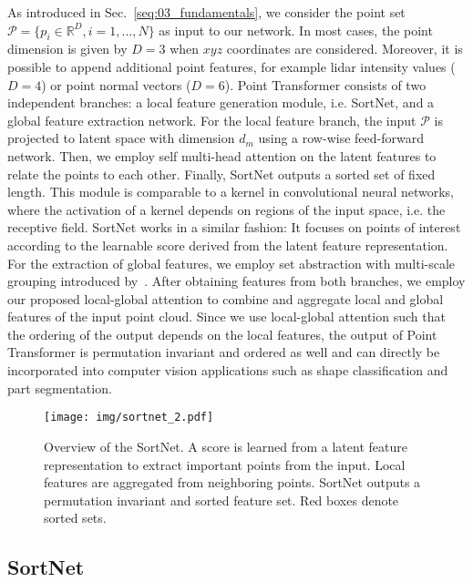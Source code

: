 \documentclass{ieeeaccess}
\begin{document}
As introduced in Sec.~\ref{seq:03_fundamentals}, we consider the point set \mbox{$\mathcal{P} = \{p_i \in \mathbb{R}^D, i = 1, \dots, N\}$} as input to our network. In most cases, the point dimension is given by $D=3$ when $xyz$ coordinates are considered. Moreover, it is possible to append additional point features, for example lidar intensity values ($D=4$) or point normal vectors ($D=6$). Point Transformer consists of two independent branches: a local feature generation module, i.e. SortNet, and a global feature extraction network. For the local feature branch, the input $\mathcal{P}$ is projected to latent space with dimension $d_m$ using a row-wise feed-forward network. Then, we employ self multi-head attention on the latent features to relate the points to each other. Finally, SortNet outputs a sorted set of fixed length. This module is comparable to a kernel in convolutional neural networks, where the activation of a kernel depends on regions of the input space, i.e. the receptive field. SortNet works in a similar fashion: It focuses on points of interest according to the learnable score derived from the latent feature representation. For the extraction of global features, we employ set abstraction with multi-scale grouping introduced by~\cite{qi2017pointnet++}.
After obtaining features from both branches, we employ our proposed local-global attention to combine and aggregate local and global features of the input point cloud.
Since we use local-global attention such that the ordering of the output depends on the local features, the output of Point Transformer is permutation invariant and ordered as well and can directly be incorporated into computer vision applications such as shape classification and part segmentation.



\begin{figure*}
\begin{center}
\texttt{[image: img/sortnet\_2.pdf]}
\end{center}
\caption{Overview of the SortNet. A score is learned from a latent feature representation to extract important points from the input. Local features are aggregated from neighboring points. SortNet outputs a permutation invariant and sorted feature set. Red boxes denote sorted sets.}
    \label{fig:point-transformer_local}
\end{figure*}

\subsection{SortNet}
\end{document}
